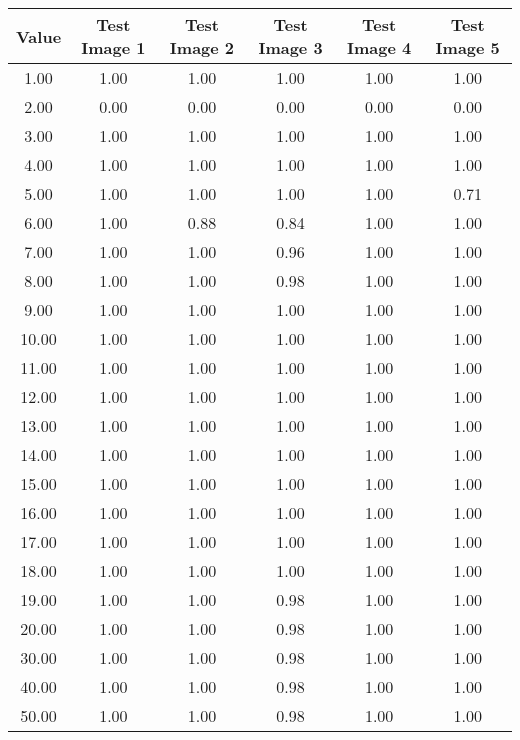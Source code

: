 \begin{tabular}{|c|c|c|c|c|c|}
\hline
\textbf{Value}&\textbf{Test Image 1}&\textbf{Test Image 2}&\textbf{Test Image 3}&\textbf{Test Image 4}&\textbf{Test Image 5}\\\hline
1.00&1.00&1.00&1.00&1.00&1.00\\\hline
2.00&0.00&0.00&0.00&0.00&0.00\\\hline
3.00&1.00&1.00&1.00&1.00&1.00\\\hline
4.00&1.00&1.00&1.00&1.00&1.00\\\hline
5.00&1.00&1.00&1.00&1.00&0.71\\\hline
6.00&1.00&0.88&0.84&1.00&1.00\\\hline
7.00&1.00&1.00&0.96&1.00&1.00\\\hline
8.00&1.00&1.00&0.98&1.00&1.00\\\hline
9.00&1.00&1.00&1.00&1.00&1.00\\\hline
10.00&1.00&1.00&1.00&1.00&1.00\\\hline
11.00&1.00&1.00&1.00&1.00&1.00\\\hline
12.00&1.00&1.00&1.00&1.00&1.00\\\hline
13.00&1.00&1.00&1.00&1.00&1.00\\\hline
14.00&1.00&1.00&1.00&1.00&1.00\\\hline
15.00&1.00&1.00&1.00&1.00&1.00\\\hline
16.00&1.00&1.00&1.00&1.00&1.00\\\hline
17.00&1.00&1.00&1.00&1.00&1.00\\\hline
18.00&1.00&1.00&1.00&1.00&1.00\\\hline
19.00&1.00&1.00&0.98&1.00&1.00\\\hline
20.00&1.00&1.00&0.98&1.00&1.00\\\hline
30.00&1.00&1.00&0.98&1.00&1.00\\\hline
40.00&1.00&1.00&0.98&1.00&1.00\\\hline
50.00&1.00&1.00&0.98&1.00&1.00\\\hline
\end{tabular}
